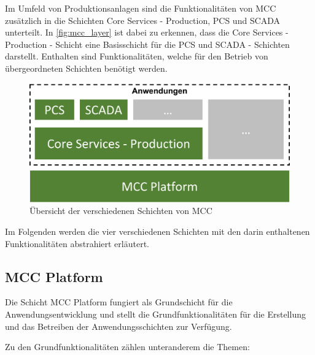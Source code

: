 Im Umfeld von Produktionsanlagen sind die Funktionalitäten von MCC zusätzlich in die Schichten \glqq Core Services - Production\grqq{}, \glqq PCS\grqq{} und \glqq SCADA\grqq{} unterteilt. In \autoref{fig:mcc_layer} ist dabei zu erkennen, dass die \glqq Core Services - Production\grqq{} - Schicht eine Basisschicht für die \glqq PCS\grqq{} und \glqq SCADA\grqq{} - Schichten darstellt. Enthalten sind Funktionalitäten, welche für den Betrieb von übergeordneten Schichten benötigt werden.

\begin{figure}[H]
    \centering
    \includegraphics[width=0.7\linewidth]{images/MCC_Layer.png}
    \caption{Übersicht der verschiedenen Schichten von MCC}
    \label{fig:mcc_layer}
\end{figure}

Im Folgenden werden die vier verschiedenen Schichten mit den darin enthaltenen Funktionalitäten abstrahiert erläutert.

\subsection{MCC Platform\label{subsec3.1.1:Unterunterpunkt-1}}

Die Schicht \glqq MCC Platform\grqq{} fungiert als Grundschicht für die Anwendungsentwicklung und stellt die Grundfunktionalitäten für die Erstellung und das Betreiben der Anwendungsschichten zur Verfügung.

Zu den Grundfunktionalitäten zählen unteranderem die Themen:


